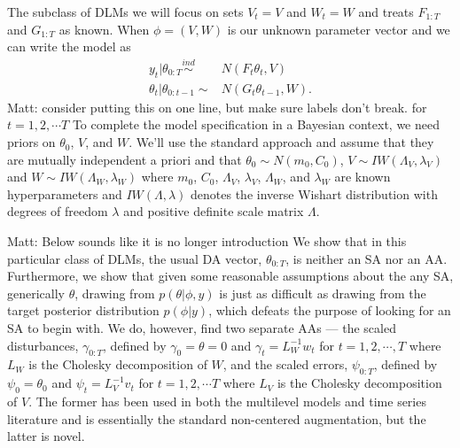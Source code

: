 \documentclass{article}
\newcommand{\matt}[1]{{\color{red} Matt: #1}}
\begin{document}
The subclass of DLMs we will focus on sets $V_t=V$ and $W_t=W$ and treats $F_{1:T}$ and $G_{1:T}$ as known. %
When $\phi=(V,W)$ is our unknown parameter vector and we can write the model as
\begin{align}
  y_t|\theta_{0:T} \stackrel{ind}{\sim} & N(F_t\theta_t,V) \label{dlmobseq}\\
  \theta_t|\theta_{0:t-1}  \sim & N(G_t\theta_{t-1},W) \label{dlmsyseq}.
\end{align}
\matt{consider putting this on one line, but make sure labels don't break. }
for $t=1,2,\cdots T$ To complete the model specification in a Bayesian context, we need priors on $\theta_0$, $V$, and $W$. We'll use the standard approach and assume that they are mutually independent a priori and that $\theta_0 \sim N(m_0, C_0)$, $V \sim IW(\Lambda_V, \lambda_V)$ and $W \sim IW(\Lambda_W, \lambda_W)$ where $m_0$, $C_0$, $\Lambda_V$, $\lambda_V$, $\Lambda_W$, and $\lambda_W$ are known hyperparameters and $IW(\Lambda, \lambda)$ denotes the inverse Wishart distribution with degrees of freedom $\lambda$ and positive definite scale matrix $\Lambda$.

\matt{Below sounds like it is no longer introduction}
We show that in this particular class of DLMs, the usual DA vector, $\theta_{0:T}$, is neither an SA nor an AA. Furthermore, we show that given some reasonable assumptions about the any SA, generically $\theta$, drawing from $p(\theta|\phi,y)$ is just as difficult as drawing from the target posterior distribution $p(\phi|y)$, which defeats the purpose of looking for an SA to begin with. We do, however, find two separate AAs --- the scaled disturbances, $\gamma_{0:T}$, defined by $\gamma_0=\theta=0$ and $\gamma_t = L_W^{-1}w_t$ for $t=1,2,\cdots, T$ where $L_W$ is the Cholesky decomposition of $W$, and the scaled errors, $\psi_{0:T}$, defined by $\psi_0=\theta_0$ and $\psi_t=L_V^{-1}v_t$ for $t=1,2,\cdots T$ where $L_V$ is the Cholesky decomposition of $V$. The former has been used in both the multilevel models and time series literature and is essentially the standard non-centered augmentation, but the latter is novel. 
\end{document}
